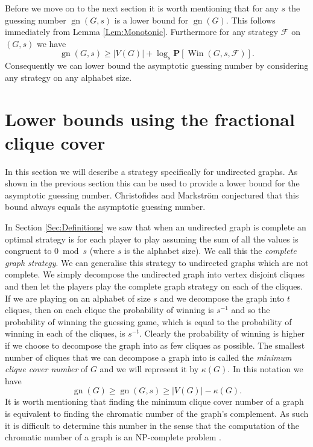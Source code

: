 \documentclass[a4paper, 14pt]{extarticle}
\theoremstyle{plain}
\def\mc{\mathcal}
\def\mb{\mathbf}
\DeclareMathOperator{\gn}{gn}
\DeclareMathOperator{\Win}{Win}
\begin{document}
Before we move on to the next section it is worth mentioning that
for any $s$ the guessing number $\gn(G,s)$ is a lower bound for
$\gn(G)$. This follows immediately from Lemma \ref{Lem:Monotonic}.
Furthermore for any strategy $\mc{F}$ on $(G,s)$ we have
\[
\gn(G,s) \geq |V(G)|+\log_s \mb{P}[\Win(G,s,\mc{F})].
\]
Consequently we can lower bound the asymptotic guessing number by
considering any strategy on any alphabet size.

\section{Lower bounds using the fractional clique
cover}\label{Sec:FractionalCliqueCover}

In this section we will describe a strategy specifically for
undirected graphs. As shown in the previous section this
can be used to provide a lower bound for the asymptotic guessing
number. Christofides and Markstr\"om \cite{Christofides&Markstrom11} conjectured that this bound
always equals the asymptotic guessing number.

In Section \ref{Sec:Definitions} we saw that when an undirected
graph is complete an optimal strategy is
for each player to play assuming the sum of all the values is
congruent to $0\bmod s$ (where $s$ is the alphabet size). We call this the \emph{complete graph strategy}. We can
generalise this strategy to undirected graphs which are not
complete. We simply decompose the undirected graph into vertex
disjoint cliques and then let the players play the complete graph
strategy on each of the cliques. If we are playing on an alphabet of size $s$ and we decompose the graph into $t$ cliques, then on each clique the probability of winning is $s^{-1}$ and so the probability of winning the guessing game, which is equal to the probability of winning in each of the cliques, is $s^{-t}$. Clearly the probability of
winning is higher if we choose to decompose the graph into as few
cliques as possible. The smallest number of cliques that we can decompose a graph into is called the \emph{minimum clique cover number} of $G$ and we will represent it by $\kappa(G)$. In this notation we have
\[\gn(G)\geq \gn(G,s)\geq |V(G)|-\kappa(G).\]
It is worth mentioning that finding
the minimum clique cover number of a graph is equivalent to finding
the chromatic number of the graph's complement. As such it is difficult to determine this number in the sense that the computation of the chromatic number of a graph is an NP-complete problem \cite{Karp72}.
\end{document}

